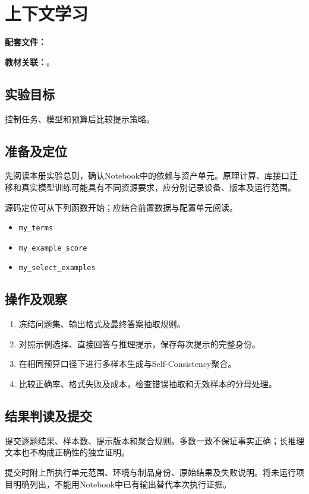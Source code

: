 \chapter{上下文学习}
\label{lab:91_prompt_reasoning}

\noindent\textbf{配套文件：}\par
\noindent\textbf{教材关联：}。

\section*{实验目标}
控制任务、模型和预算后比较提示策略。

\section*{准备及定位}
先阅读本册实验总则，确认Notebook中的依赖与资产单元。原理计算、库接口迁移和真实模型训练可能具有不同资源要求，应分别记录设备、版本及运行范围。

源码定位可从下列函数开始；应结合前置数据与配置单元阅读。
\begin{itemize}
\item \texttt{my\_terms}
\item \texttt{my\_example\_score}
\item \texttt{my\_select\_examples}
\end{itemize}

\section*{操作及观察}
\begin{enumerate}
\item 冻结问题集、输出格式及最终答案抽取规则。
\item 对照示例选择、直接回答与推理提示，保存每次提示的完整身份。
\item 在相同预算口径下进行多样本生成与Self-Consistency聚合。
\item 比较正确率、格式失败及成本，检查错误抽取和无效样本的分母处理。
\end{enumerate}

\section*{结果判读及提交}
提交逐题结果、样本数、提示版本和聚合规则。多数一致不保证事实正确；长推理文本也不构成正确性的独立证明。

提交时附上所执行单元范围、环境与制品身份、原始结果及失败说明。将未运行项目明确列出，不能用Notebook中已有输出替代本次执行证据。
